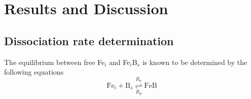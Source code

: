 \documentclass{WileyMSP-template}
\begin{document}
%
%
%
%


\section{Results and Discussion}

\subsection{Dissociation rate determination}\label{SecR}

The equilibrium between free Fe$_i$ and Fe$_i$B$_s$ is known to be determined by the following equations \cite{FeB:kinetic,Sun2021}
\begin{equation}
\label{eqReac}
\mathrm{Fe}_i+\mathrm{B}_s  \overset{R_a}{\underset{R_d}{\rightleftharpoons{}}} \mathrm{FeB}
\end{equation}

\end{document}

